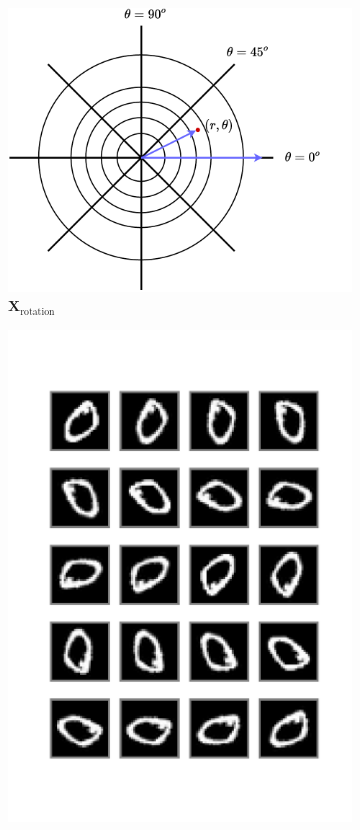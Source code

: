 \documentclass[../../book-main.tex]{subfiles}
\begin{document}
\begin{example}[数字的不变分类]
\begin{figure}[t]
    \begin{subfigure}[t]{0.3\textwidth}
        \centering
        \includegraphics[width=\textwidth]{figs_chap4/1d-rotation.pdf}
        \caption{$\bm{X}_{\text{rotation}}$}
    \end{subfigure}
    \hfill
    \begin{subfigure}[t]{0.3\textwidth}
        \centering
        \includegraphics[width=\textwidth]{figs_chap4/mnist1d_img0.pdf}

\end{subfigure}
\end{figure}
\end{example}
\end{document}
